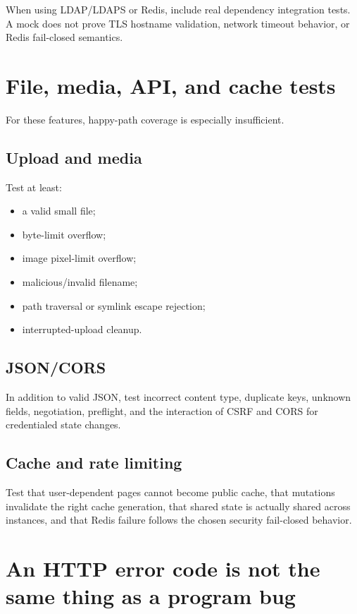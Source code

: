 When using LDAP/LDAPS or Redis, include real dependency integration tests. A mock does not prove TLS hostname validation, network timeout behavior, or Redis fail-closed semantics.

\section{File, media, API, and cache tests}

For these features, happy-path coverage is especially insufficient.

\subsection*{Upload and media}

Test at least:

\begin{itemize}
  \item a valid small file;
  \item byte-limit overflow;
  \item image pixel-limit overflow;
  \item malicious/invalid filename;
  \item path traversal or symlink escape rejection;
  \item interrupted-upload cleanup.
\end{itemize}

\subsection*{JSON/CORS}

In addition to valid JSON, test incorrect content type, duplicate keys, unknown fields,  negotiation, preflight, and the interaction of CSRF and CORS for credentialed state changes.

\subsection*{Cache and rate limiting}

Test that user-dependent pages cannot become public cache, that mutations invalidate the right cache generation, that shared state is actually shared across instances, and that Redis failure follows the chosen security fail-closed behavior.

\section{An HTTP error code is not the same thing as a program bug}

